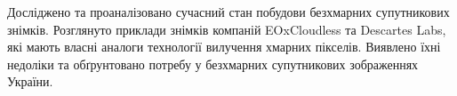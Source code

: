 \clearpage
\chapterConclusion Досліджено та проаналізовано %
сучасний стан побудови безхмарних
супутникових знімків.  Розглянуто приклади %
знімків компаній EOxCloudless та Descartes
Labs, які мають власні аналоги технології %
вилучення хмарних пікселів.  Виявлено їхні
недоліки та обґрунтовано потребу у безхмарних %
супутникових зображеннях України.
